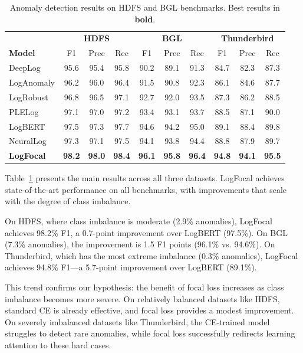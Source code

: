 \documentclass[conference]{IEEEtran}
\begin{document}
\begin{table}[t]
\centering
\caption{Anomaly detection results on HDFS and BGL benchmarks. Best results in \textbf{bold}.}
\label{tab:main}
\small
\setlength{\tabcolsep}{3pt}
\begin{tabular}{lccc|ccc|ccc}
\toprule
& \multicolumn{3}{c|}{\textbf{HDFS}} & \multicolumn{3}{c|}{\textbf{BGL}} & \multicolumn{3}{c}{\textbf{Thunderbird}} \\
\textbf{Model} & F1 & Prec & Rec & F1 & Prec & Rec & F1 & Prec & Rec \\
\midrule
DeepLog & 95.6 & 95.4 & 95.8 & 90.2 & 89.1 & 91.3 & 84.7 & 82.3 & 87.3 \\
LogAnomaly & 96.2 & 96.0 & 96.4 & 91.5 & 90.8 & 92.3 & 86.1 & 84.6 & 87.7 \\
LogRobust & 96.8 & 96.5 & 97.1 & 92.7 & 92.0 & 93.5 & 87.3 & 86.2 & 88.5 \\
PLELog & 97.1 & 97.0 & 97.2 & 93.4 & 93.1 & 93.7 & 88.5 & 87.1 & 90.0 \\
LogBERT & 97.5 & 97.3 & 97.7 & 94.6 & 94.2 & 95.0 & 89.1 & 88.4 & 89.8 \\
NeuralLog & 97.3 & 97.1 & 97.5 & 94.1 & 93.8 & 94.4 & 88.8 & 87.9 & 89.7 \\
\midrule
\textbf{LogFocal} & \textbf{98.2} & \textbf{98.0} & \textbf{98.4} & \textbf{96.1} & \textbf{95.8} & \textbf{96.4} & \textbf{94.8} & \textbf{94.1} & \textbf{95.5} \\
\bottomrule
\end{tabular}
\end{table}

Table~\ref{tab:main} presents the main results across all three datasets.
LogFocal achieves state-of-the-art performance on all benchmarks,
with improvements that scale with the degree of class imbalance.

On HDFS, where class imbalance is moderate (2.9\% anomalies),
LogFocal achieves 98.2\% F1, a 0.7-point improvement over LogBERT (97.5\%).
On BGL (7.3\% anomalies), the improvement is 1.5 F1 points (96.1\% vs. 94.6\%).
On Thunderbird, which has the most extreme imbalance (0.3\% anomalies),
LogFocal achieves 94.8\% F1---a 5.7-point improvement over LogBERT (89.1\%).

This trend confirms our hypothesis: the benefit of focal loss increases
as class imbalance becomes more severe.
On relatively balanced datasets like HDFS, standard CE is already effective,
and focal loss provides a modest improvement.
On severely imbalanced datasets like Thunderbird,
the CE-trained model struggles to detect rare anomalies,
while focal loss successfully redirects learning attention to these hard cases.
\end{document}
